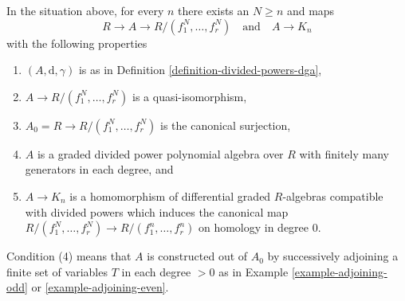 \begin{lemma}
\label{lemma-lift-tate-to-koszul}
In the situation above, for every $n$ there exists an $N \geq n$
and maps
$$
R \to A \to R/(f_1^N, \ldots, f_r^N)\quad\text{and}\quad A \to K_n
$$
with the following properties
\begin{enumerate}
\item $(A, \text{d}, \gamma)$ is as in
Definition \ref{definition-divided-powers-dga},
\item $A \to R/(f_1^N, \ldots, f_r^N)$ is a quasi-isomorphism,
\item $A_0 = R \to R/(f_1^N, \ldots, f_r^N)$ is the canonical
surjection,
\item $A$ is a graded divided power polynomial algebra over $R$
with finitely many generators in each degree, and
\item $A \to K_n$ is a homomorphism of differential graded $R$-algebras
compatible with divided powers which induces the canonical map
$R/(f_1^N, \ldots, f_r^N) \to R/(f_1^n, \ldots, f_r^n)$ on
homology in degree $0$.
\end{enumerate}
Condition (4) means that $A$ is constructed out of $A_0$ by
successively adjoining a finite set of variables $T$ in each degree
$> 0$ as in Example \ref{example-adjoining-odd} or \ref{example-adjoining-even}.
\end{lemma}


